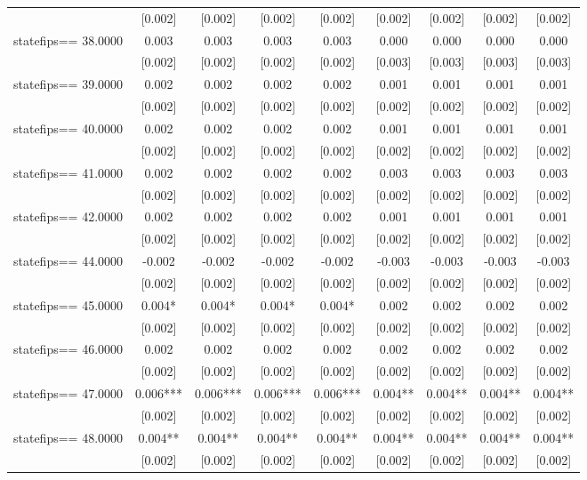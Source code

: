 \documentclass[]{article}
\begin{document}
\begin{tabular}{lcccccccc}
 & [0.002] & [0.002] & [0.002] & [0.002] & [0.002] & [0.002] & [0.002] & [0.002] \\
statefips==    38.0000 & 0.003 & 0.003 & 0.003 & 0.003 & 0.000 & 0.000 & 0.000 & 0.000 \\
 & [0.002] & [0.002] & [0.002] & [0.002] & [0.003] & [0.003] & [0.003] & [0.003] \\
statefips==    39.0000 & 0.002 & 0.002 & 0.002 & 0.002 & 0.001 & 0.001 & 0.001 & 0.001 \\
 & [0.002] & [0.002] & [0.002] & [0.002] & [0.002] & [0.002] & [0.002] & [0.002] \\
statefips==    40.0000 & 0.002 & 0.002 & 0.002 & 0.002 & 0.001 & 0.001 & 0.001 & 0.001 \\
 & [0.002] & [0.002] & [0.002] & [0.002] & [0.002] & [0.002] & [0.002] & [0.002] \\
statefips==    41.0000 & 0.002 & 0.002 & 0.002 & 0.002 & 0.003 & 0.003 & 0.003 & 0.003 \\
 & [0.002] & [0.002] & [0.002] & [0.002] & [0.002] & [0.002] & [0.002] & [0.002] \\
statefips==    42.0000 & 0.002 & 0.002 & 0.002 & 0.002 & 0.001 & 0.001 & 0.001 & 0.001 \\
 & [0.002] & [0.002] & [0.002] & [0.002] & [0.002] & [0.002] & [0.002] & [0.002] \\
statefips==    44.0000 & -0.002 & -0.002 & -0.002 & -0.002 & -0.003 & -0.003 & -0.003 & -0.003 \\
 & [0.002] & [0.002] & [0.002] & [0.002] & [0.002] & [0.002] & [0.002] & [0.002] \\
statefips==    45.0000 & 0.004* & 0.004* & 0.004* & 0.004* & 0.002 & 0.002 & 0.002 & 0.002 \\
 & [0.002] & [0.002] & [0.002] & [0.002] & [0.002] & [0.002] & [0.002] & [0.002] \\
statefips==    46.0000 & 0.002 & 0.002 & 0.002 & 0.002 & 0.002 & 0.002 & 0.002 & 0.002 \\
 & [0.002] & [0.002] & [0.002] & [0.002] & [0.002] & [0.002] & [0.002] & [0.002] \\
statefips==    47.0000 & 0.006*** & 0.006*** & 0.006*** & 0.006*** & 0.004** & 0.004** & 0.004** & 0.004** \\
 & [0.002] & [0.002] & [0.002] & [0.002] & [0.002] & [0.002] & [0.002] & [0.002] \\
statefips==    48.0000 & 0.004** & 0.004** & 0.004** & 0.004** & 0.004** & 0.004** & 0.004** & 0.004** \\
 & [0.002] & [0.002] & [0.002] & [0.002] & [0.002] & [0.002] & [0.002] & [0.002] \\

\end{tabular}
\end{document}
